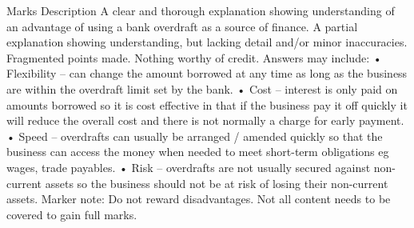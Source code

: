 \documentclass{article}
\begin{document}
Marks \newline
Description   \newline
A clear and thorough explanation showing understanding of an advantage of using a \newline
bank overdraft as a source of finance.   \newline
A partial explanation showing understanding, but lacking detail and/or minor \newline
inaccuracies.   \newline
Fragmented points made.   \newline
Nothing worthy of credit. \newline
 \newline
Answers may include: \newline
 \newline
• Flexibility – can change the amount borrowed at any time as long as the business are within the \newline
overdraft limit set by the bank. \newline
• Cost – interest is only paid on amounts borrowed so it is cost effective in that if the business pay it off \newline
quickly it will reduce the overall cost and there is not normally a charge for early payment. \newline
• Speed – overdrafts can usually be arranged / amended quickly so that the business can access the \newline
money when needed to meet short-term obligations eg wages, trade payables. \newline
• Risk – overdrafts are not usually secured against non- current assets so the business should not be at \newline
risk of losing their non-current assets. \newline
 \newline
Marker note: \newline
 \newline
Do not reward disadvantages. \newline
 \newline
Not all content needs to be covered to gain full marks. \newline
\end{document}
